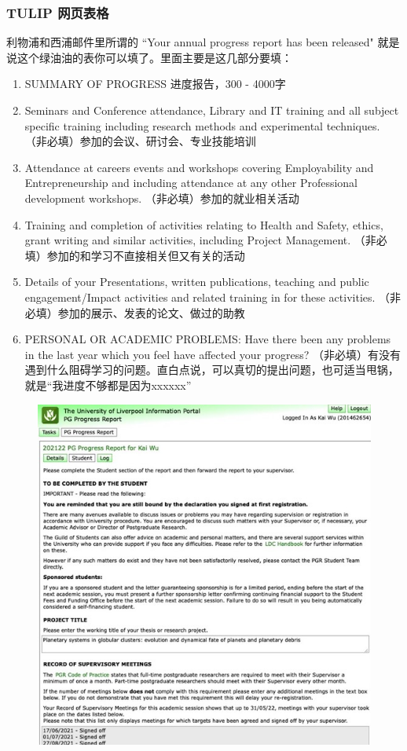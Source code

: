 \subsubsection{TULIP 网页表格}
利物浦和西浦邮件里所谓的 “Your annual progress report has been released" 就是说这个绿油油的表你可以填了。里面主要是这几部分要填：
\begin{enumerate}
    \item SUMMARY OF PROGRESS 进度报告，300 - 4000字
    \item Seminars and Conference attendance, Library and IT training and all subject specific training including research methods and experimental techniques. （非必填）参加的会议、研讨会、专业技能培训
    \item Attendance at careers events and workshops covering Employability and Entrepreneurship and including attendance at any other Professional development workshops. （非必填）参加的就业相关活动
    \item Training and completion of activities relating to Health and Safety, ethics, grant writing and similar activities, including Project Management. （非必填）参加的和学习不直接相关但又有关的活动
    \item Details of your Presentations, written publications, teaching and public engagement/Impact activities and related training in for these activities. （非必填）参加的展示、发表的论文、做过的助教
    \item PERSONAL OR ACADEMIC PROBLEMS: Have there been any problems in the last year which you feel have affected your progress? （非必填）有没有遇到什么阻碍学习的问题。直白点说，可以真切的提出问题，也可适当甩锅，就是“我进度不够都是因为xxxxxx”
\end{enumerate}

\begin{figure}[H]
    \includegraphics[width=0.95\columnwidth, right]{author-folder/Kai.Wu/TULIP.jpg}
\end{figure}


